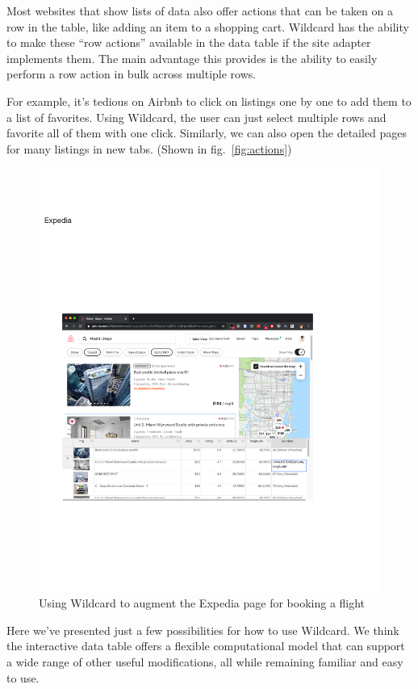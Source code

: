 \documentclass[english,submission]{programming}
\begin{document}
Most websites that show lists of data also offer actions that can be
taken on a row in the table, like adding an item to a shopping cart.
Wildcard has the ability to make these ``row actions'' available in the
data table if the site adapter implements them. The main advantage this
provides is the ability to easily perform a row action in bulk across
multiple rows.

For example, it's tedious on Airbnb to click on listings one by one to
add them to a list of favorites. Using Wildcard, the user can just
select multiple rows and favorite all of them with one click. Similarly,
we can also open the detailed pages for many listings in new tabs.
(Shown in fig.~\ref{fig:actions})

\begin{figure}
\hypertarget{fig:expedia-demo}{%
\centering
\includegraphics{media/expedia-demo-300dpi.png}
\caption{Using Wildcard to augment the Expedia page for booking a
flight}\label{fig:expedia-demo}
}
\end{figure}

Here we've presented just a few possibilities for how to use Wildcard.
We think the interactive data table offers a flexible computational
model that can support a wide range of other useful modifications, all
while remaining familiar and easy to use.
\end{document}
